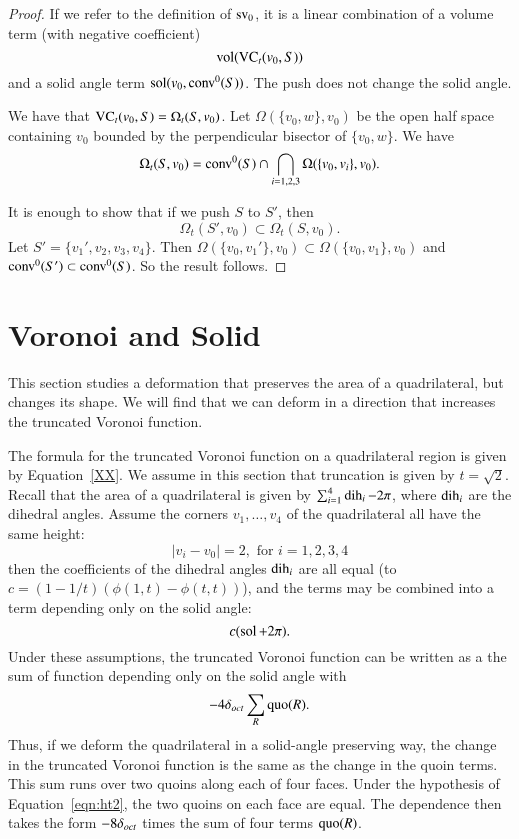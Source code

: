 \begin{proof}  If we refer to the definition of ${\operatorname{sv}}_0$, it
is a linear combination of a volume term (with negative coefficient)
   $${\operatorname{vol}}({\operatorname{VC}}_t(v_0,S))$$
and a solid angle term ${\operatorname{sol}}(v_0,{\operatorname{conv}}^0(S))$.
The push does not change the solid angle.

We have that ${\operatorname{VC}}_t(v_0,S) = \Omega_t(S,v_0)$.
Let $\Omega(\{v_0,w\},v_0)$ be the open half space
containing $v_0$ bounded by the perpendicular bisector of $\{v_0,w\}$.
We have 
$$
  \Omega_t(S,v_0) = 
  {\operatorname{conv}}^0(S) \cap \bigcap_{i=1,2,3} \Omega(\{v_0,v_i\},v_0).
$$

It is enough to show that if we push $S$ to $S'$, then
  $$
  \Omega_t(S',v_0) \subset \Omega_t(S,v_0).
  $$
Let $S'=\{v_1',v_2,v_3,v_4\}$.  Then $\Omega(\{v_0,v_1'\},v_0)\subset 
     \Omega(\{v_0,v_1\},v_0)$
and ${\operatorname{conv}}^0(S')\subset {\operatorname{conv}}^0(S)$.  So the result follows. 
\end{proof}





\section{Voronoi and Solid}

This section studies a deformation that preserves the area of a
quadrilateral, but changes its shape.  We will find that we can
deform in a direction that increases the truncated Voronoi
function.

The formula for the truncated Voronoi function on a quadrilateral
region is given by Equation~\ref{XX}.  We assume in this section
that truncation is given by $t=\sqrt2$.  Recall that the area of a
quadrilateral is given by $\sum_{i=1}^4 \operatorname{dih}_i - 2\pi$, where
$\operatorname{dih}_i$ are the dihedral angles.  Assume the corners
$v_1,\ldots,v_4$ of the quadrilateral all have the same height:
    \begin{equation}\label{eqn:ht2}
    |v_i-v_0| = 2,\text{ for } i=1,2,3,4
    \end{equation}
then the coefficients of the dihedral angles ${\operatorname{dih}}_i$ are all
equal (to $c=(1-1/t)(\phi(1,t)-\phi(t,t))$), and the terms may be
combined into a term depending only on the solid angle:
    $$c (\operatorname{sol} + 2\pi).$$
Under these assumptions, the truncated Voronoi function can be
written as a the sum of function depending only on the solid angle
with
    $$
    -4 \delta_{oct} \sum_R \operatorname{quo}(R).
    $$
Thus, if we deform the quadrilateral in a solid-angle preserving
way, the change in the truncated Voronoi function is the same as
the change in the quoin terms.  This sum runs over two quoins
along each of four faces.  Under the hypothesis of
Equation~\ref{eqn:ht2}, the two quoins on each face are equal. The
dependence then takes the form $-8\delta_{oct}$ times the sum of four
terms $\operatorname{quo}(R)$.

